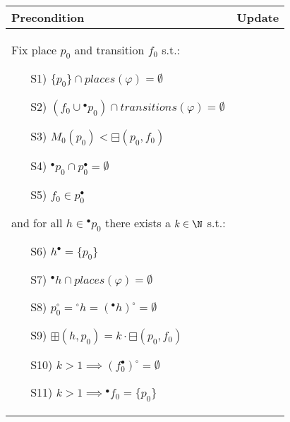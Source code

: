 \begin{figure}[h!]
    \begin{adjustbox}{center}
        \begin{tabular}{|p{75mm}|p{75mm}|} \hline
        Precondition & Update \\ \hline
        Fix place $p_0$ and transition $f_0$ s.t.:
        \begin{itemize}[leftmargin=10mm]
            \item[S1)] $\{p_0\} \cap places(\varphi) = \emptyset$
            \item[S2)] $(f_0 \cup {}^\bullet p_0) \cap transitions(\varphi) = \emptyset$
            \item[S3)] $M_0(p_0) < \boxminus(p_0,f_0)$
            \item[S4)] $^\bullet p_0 \cap p_0^\bullet = \emptyset$
            \item[S5)] $f_0 \in p_0^\bullet$
        \end{itemize}
        \hspace{2mm}
        \noindent and for all $h\in{}^\bullet p_0$ there exists a $k\in\N$ s.t.:
        \begin{itemize}[leftmargin=10mm]
            \item[S6)] $h^\bullet=\{p_0\}$
            \item[S7)] ${}^\bullet h \cap places(\varphi) = \emptyset$
            \item[S8)] $p_0^\circ = {}^\circ h = ({}^\bullet h)^\circ = \emptyset$
            \item[S9)] $\boxplus(h, p_0) = k\cdot\boxminus(p_0,f_0)$
            \item[S10)] $k > 1 \implies (f_0^\bullet)^\circ = \emptyset$
            \item[S11)] $k > 1 \implies{}^\bullet f_0 = \{p_0\}$
        \end{itemize}
        \hspace{2mm}


\end{tabular}
\end{adjustbox}
\end{figure}
